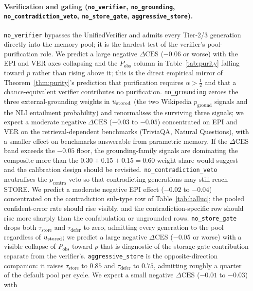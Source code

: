 \paragraph{Verification and gating
(\texttt{no\_verifier}, \texttt{no\_grounding},
\texttt{no\_contradiction\_veto}, \texttt{no\_store\_gate},
\texttt{aggressive\_store}).}
\texttt{no\_verifier} bypasses the UnifiedVerifier and admits every
Tier-2/3 generation directly into the memory pool; it is the hardest
test of the verifier's pool-purification role. We predict a large
negative $\Delta\text{CES}$ ($-0.06$ or worse) with the EPI and VER
axes collapsing and the $P_{\text{obs}}$ column in
Table~\ref{tab:purity} falling toward $p$ rather than rising above it;
this is the direct empirical mirror of Theorem~\ref{thm:purity}'s
prediction that purification requires $\alpha > \tfrac{1}{2}$ and
that a chance-equivalent verifier contributes no purification.
\texttt{no\_grounding} zeroes the three external-grounding weights in
$u_{\text{stored}}$ (the two Wikipedia $p_{\text{ground}}$ signals and the
NLI entailment probability) and renormalises the surviving three
signals; we expect a moderate negative $\Delta\text{CES}$ ($-0.03$ to
$-0.05$) concentrated on EPI and VER on the retrieval-dependent
benchmarks (TriviaQA, Natural Questions), with a smaller effect on
benchmarks answerable from parametric memory. If the $\Delta\text{CES}$
band exceeds the $-0.05$ floor, the grounding-family signals are
dominating the composite more than the $0.30 + 0.15 + 0.15 = 0.60$
weight share would suggest and the calibration design should be
revisited. \texttt{no\_contradiction\_veto} neutralises the
$p_{\text{contra}}$ veto so that contradicting generations may still
reach STORE. We predict a moderate negative EPI effect ($-0.02$ to
$-0.04$) concentrated on the contradiction sub-type row of
Table~\ref{tab:halluc}; the pooled confident-error rate should rise
visibly, and the contradiction-specific row should rise more sharply
than the confabulation or ungrounded rows. \texttt{no\_store\_gate}
drops both $\tau_{\text{store}}$ and $\tau_{\text{defer}}$ to zero,
admitting every generation to the pool regardless of $u_{\text{stored}}$; we
predict a large negative $\Delta\text{CES}$ ($-0.05$ or worse) with
a visible collapse of $P_{\text{obs}}$ toward $p$ that is diagnostic
of the storage-gate contribution separate from the verifier's.
\texttt{aggressive\_store} is the opposite-direction companion: it
raises $\tau_{\text{store}}$ to $0.85$ and $\tau_{\text{defer}}$ to
$0.75$, admitting roughly a quarter of the default pool per cycle. We
expect a small negative $\Delta\text{CES}$ ($-0.01$ to $-0.03$) with
